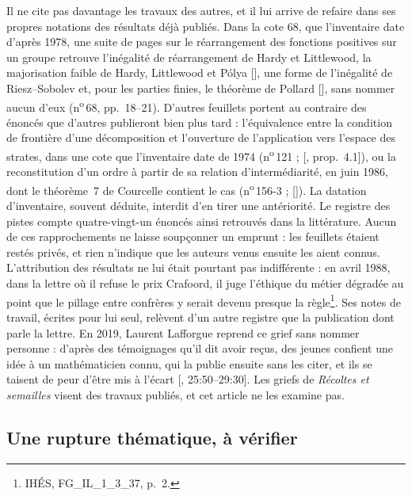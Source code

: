 \documentclass[11pt]{amsart}
\newcommand{\ts}[1]{\foreignlanguage{english}{#1}}
\newcommand{\cote}[1]{\mbox{n\textsuperscript{o}\,#1}}
\begin{document}
Il ne cite pas davantage les travaux des autres, et il lui arrive de refaire dans ses propres notations des résultats déjà publiés. Dans la cote 68, que l'inventaire date d'après 1978, une suite de pages sur le réarrangement des fonctions positives sur un groupe retrouve l'inégalité de réarrangement de Hardy et Littlewood, la majorisation faible de Hardy, Littlewood et Pólya [\citealp{hlp1934}], une forme de l'inégalité de Riesz--Sobolev et, pour les parties finies, le théorème de Pollard [\citealp{pollard1974}], sans nommer aucun d'eux (\cote{68}, pp.~18--21). D'autres feuillets portent au contraire des énoncés que d'autres publieront bien plus tard : l'équivalence entre la condition de frontière d'une décomposition et l'ouverture de l'application vers l'espace des strates, dans une cote que l'inventaire date de 1974 (\cote{121} ; [\citealp{waaswoolfyokura2024}, prop.~4.1]), ou la reconstitution d'un ordre à partir de sa relation d'intermédiarité, en juin 1986, dont le théorème~7 de Courcelle contient le cas (\cote{156-3} ; [\citealp{courcelle2020}]). La datation d'inventaire, souvent déduite, interdit d'en tirer une antériorité. Le registre des pistes compte quatre-vingt-un énoncés ainsi retrouvés dans la littérature. Aucun de ces rapprochements ne laisse soupçonner un emprunt : les feuillets étaient restés privés, et rien n'indique que les auteurs venus ensuite les aient connus. L'attribution des résultats ne lui était pourtant pas indifférente : en avril 1988, dans la lettre où il refuse le prix Crafoord, il juge l'éthique du métier dégradée au point que le pillage entre confrères y serait devenu presque la règle\footnote{IHÉS, FG\_IL\_1\_3\_37, p.~2.}. Ses notes de travail, écrites pour lui seul, relèvent d'un autre registre que la publication dont parle la lettre. En 2019, Laurent Lafforgue reprend ce grief sans nommer personne : d'après des témoignages qu'il dit avoir reçus, des jeunes confient une idée à un mathématicien connu, qui la publie ensuite sans les citer, et ils se taisent de peur d'être mis à l'écart [\citealp{lafforgue2019}, \ts{25:50--29:30}]. Les griefs de \emph{Récoltes et semailles} visent des travaux publiés, et cet article ne les examine pas.

\subsection{Une rupture thématique, à vérifier}\label{sub:rupture}
\end{document}
